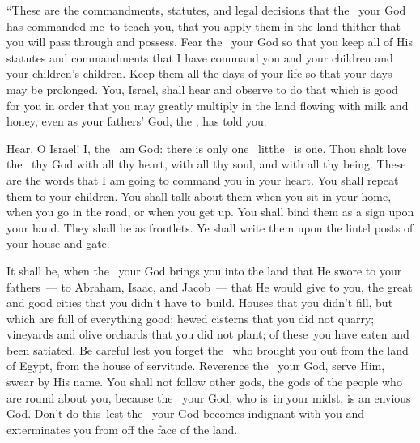 
\begin{inparaenum}
   ``These are the commandments, statutes, and legal decisions that the \lord\ your God has commanded me\understood\ to teach you, that you apply them in the land thither that you will pass through and possess.%
   Fear the \lord\ your God so that you keep all of His statutes and commandments that I have command you and your children and your children's children. Keep them all the days of your life so that your days may be prolonged.%
   You, Israel, shall hear and observe to do that which is good for you in order that you may greatly multiply in the land flowing with milk and honey, even as your fathers' God, the \lord, has told you.%
  
   Hear, O Israel! I, the \lord\ am God: there is only one \lord\ lit{the \lord\ is one}.%
   Thou shalt love the \lord\ thy God with all thy heart, with all thy soul, and with all thy being.%
   These are the words that I am going to command you in your heart.%
   You shall repeat them to your children. You shall talk about them when you sit in your home, when you go in the road, or when you get up.%
   You shall bind them as a sign upon your hand. They shall be as frontlets.%
   Ye shall write them upon the lintel posts of your house and gate.%
  
   It shall be, when the \lord\ your God brings you into the land that He swore to your fathers~--- to Abraham, Isaac, and Jacob~--- that He would give to you, the great and good cities that you didn't have to\understood\ build.%
   Houses that you didn't fill, but which are full of everything good; hewed cisterns that you did not quarry; vineyards and olive orchards that you did not plant; of these\understood\ you have eaten and been satiated.%
   Be careful lest you forget the \lord\ who brought you out from the land of Egypt, from the house of servitude.%
   Reverence the \lord\ your God, serve Him, swear by His name.%
   You shall not follow other gods, the gods of the people who are round about you,%
   because the \lord\ your God, who is\understood\ in your midst, is an envious God. Don't do this\understood\ lest the \lord\ your God becomes indignant with you and exterminates you from off the face of the land.%
  

\end{inparaenum}
